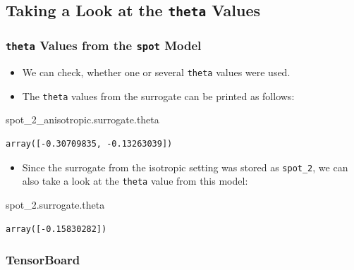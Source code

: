 \documentclass[
  letterpaper,
  DIV=11,
  numbers=noendperiod]{scrreprt}
\newenvironment{Shaded}{\begin{snugshade}}{\end{snugshade}}
\newcommand{\NormalTok}[1]{\textcolor[rgb]{0.00,0.23,0.31}{#1}}
\providecommand{\tightlist}{%
  \setlength{\itemsep}{0pt}\setlength{\parskip}{0pt}}\usepackage{longtable,booktabs,array}
\begin{document}
\hypertarget{taking-a-look-at-the-theta-values}{%
\subsection{\texorpdfstring{Taking a Look at the \texttt{theta}
Values}{Taking a Look at the theta Values}}\label{taking-a-look-at-the-theta-values}}

\hypertarget{theta-values-from-the-spot-model}{%
\subsubsection{\texorpdfstring{\texttt{theta} Values from the
\texttt{spot}
Model}{theta Values from the spot Model}}\label{theta-values-from-the-spot-model}}

\begin{itemize}
\tightlist
\item
  We can check, whether one or several \texttt{theta} values were used.
\item
  The \texttt{theta} values from the surrogate can be printed as
  follows:
\end{itemize}

\begin{Shaded}
\begin{Highlighting}[]
\NormalTok{spot\_2\_anisotropic.surrogate.theta}
\end{Highlighting}
\end{Shaded}

\begin{verbatim}
array([-0.30709835, -0.13263039])
\end{verbatim}

\begin{itemize}
\tightlist
\item
  Since the surrogate from the isotropic setting was stored as
  \texttt{spot\_2}, we can also take a look at the \texttt{theta} value
  from this model:
\end{itemize}

\begin{Shaded}
\begin{Highlighting}[]
\NormalTok{spot\_2.surrogate.theta}
\end{Highlighting}
\end{Shaded}

\begin{verbatim}
array([-0.15830282])
\end{verbatim}

\hypertarget{tensorboard-5}{%
\subsubsection{TensorBoard}\label{tensorboard-5}}
\end{document}
